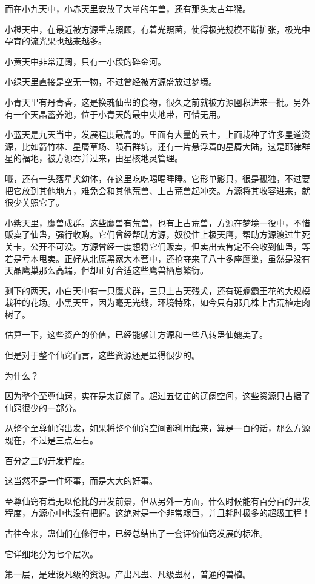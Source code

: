 \begin{this_body}
而在小九天中，小赤天里安放了大量的年兽，还有那头太古年猴。

小橙天中，在最近被方源重点照顾，有着光照菌，使得极光规模不断扩张，极光中孕育的流光果也越来越多。

小黄天中非常辽阔，只有一小段的碎金河。

小绿天里直接是空无一物，不过曾经被方源盛放过梦境。

小青天里有丹青香，这是换魂仙蛊的食物，很久之前就被方源囤积进来一批。另外有一个天晶蓄养池，位于小青天的最中央地带，可惜无用。

小蓝天是九天当中，发展程度最高的。里面有大量的云土，上面栽种了许多星道资源，比如箭竹林、星屑草场、陨石群坑，还有一片悬浮着的星屑大陆，这是耶律群星的福地，被方源吞并过来，由星核地灵管理。

哦，还有一头落星犬幼体，在这里吃吃喝喝睡睡。它形单影只，很是孤独，不过要把它放到其他地方，难免会和其他荒兽、上古荒兽起冲突。方源将其收容进来，就很少关照它了。

小紫天里，鹰兽成群。这些鹰兽有荒兽，也有上古荒兽，方源在梦境一役中，不惜贩卖了仙蛊，强行收购。它们曾经帮助方源，奴役住上极天鹰，帮助方源渡过生死关卡，公开不可没。方源曾经一度想将它们贩卖，但卖出去肯定不会收到仙蛊，等若是亏本甩卖。正好从北原黑家大本营中，还抢夺来了八十多座鹰巢，虽然是没有天晶鹰巢那么高端，但却正好合适这些鹰兽栖息繁衍。

剩下的两天，小白天中有一只鹰犬群，三只上古天残犬，还有斑斓霸王花的大规模栽种的花场。小黑天里，因为毫无光线，环境特殊，如今只有那几株上古荒植走肉树了。

估算一下，这些资产的价值，已经能够让方源和一些八转蛊仙媲美了。

但是对于整个仙窍而言，这些资源还是显得很少的。

为什么？

因为整个至尊仙窍，实在是太辽阔了。超过五亿亩的辽阔空间，这些资源只占据了仙窍很少的一部分。

从整个至尊仙窍出发，如果将整个仙窍空间都利用起来，算是一百的话，那么方源现在，不过是三点左右。

百分之三的开发程度。

这当然不是一件坏事，而是大大的好事。

至尊仙窍有着无以伦比的开发前景，但从另外一方面，什么时候能有百分百的开发程度，方源心中也没有把握。这绝对是一个非常艰巨，并且耗时极多的超级工程！

古往今来，蛊仙们在修行中，已经总结出了一套评价仙窍发展的标准。

它详细地分为七个层次。

第一层，是建设凡级的资源。产出凡蛊、凡级蛊材，普通的兽植。


\end{this_body}
